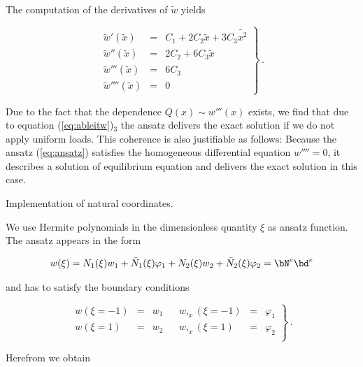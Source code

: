 The computation of the derivatives of $\tilde{w}$ yields

\begin{equation}
\left.
\begin{array}{rcl}
\tilde{w}' (\tilde{x})  & = & C_1 + 2 C_2 \tilde{x} + 3 C_3 \tilde{x^2} \\
\tilde{w}'' (\tilde{x}) & = & 2 C_2 + 6 C_3  \tilde{x} \\
\tilde{w}''' (\tilde{x})& = & 6 C_3 \\
\tilde{w}'''' (\tilde{x})& = & 0
\end{array}
\right\} \, . 
\label{eq:ableitw}
\end{equation}

Due to the fact that the dependence $Q(x) \sim w'''(x)$ 
exists, we find that due to equation (\ref{eq:ableitw})${}_3$ 
the ansatz delivers the exact solution if we do not apply 
uniform loads. 
This coherence is also justifiable as follows: 
Because the ansatz (\ref{eq:ansatz}) satisfies the 
homogeneous differential equation $w''''= 0$, 
it describes a solution of equilibrium equation and 
delivers the exact solution in this case. 

\begin{Figure}[htb]
\begin{center}

\setlength{\baselineskip}{11pt}
\caption{Implementation of natural coordinates.}
\label{fig305}
\end{center}
\end{Figure}%

We use Hermite polynomials in the dimensionless quantity 
$\xi$ as ansatz function. 
The ansatz appears in the form

\begin{eqnarray*}
w(\xi) = N_1(\xi) w_1 + \bar{N}_1(\xi) \varphi_1 + N_2(\xi) w_2 +
\bar{N}_2(\xi) \varphi_2 = \bN^e \bd^e
\end{eqnarray*}

and has to satisfy the boundary conditions 

\begin{equation}
\left.
\begin{array}{rclccrcl}
w(\xi = -1) & = & w_1  & & w,_x (\xi = -1) & = & \varphi_1 \\
w(\xi = 1) &  = & w_2  & & w,_x (\xi = 1)  & = & \varphi_2 \\
\end{array}
\right\} \, .
\end{equation}

Herefrom we obtain 

